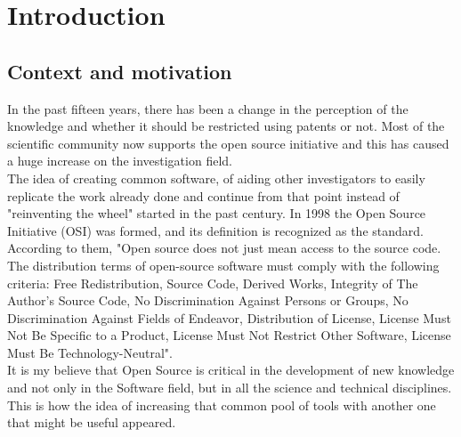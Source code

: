 \part{Introduction}

%	 
%	





\chapter{Context and motivation}
In the past fifteen years, there has been a change in the perception of the knowledge and whether it should be restricted using patents or not. Most of the scientific community now supports the open source initiative and this has caused a huge increase on the investigation field. \\



The idea of creating common software, of aiding other investigators to easily replicate the work already done and continue from that point instead of "reinventing the wheel" started in the past century. In 1998 the Open Source Initiative (OSI)\cite{osi} was formed, and its definition is recognized as the standard. According to them, "Open source does not just mean access to the source code. The distribution terms of open-source software must comply with the following criteria: Free Redistribution, Source Code, Derived Works, Integrity of The Author's Source Code, No Discrimination Against Persons or Groups, No Discrimination Against Fields of Endeavor, Distribution of License, License Must Not Be Specific to a Product, License Must Not Restrict Other Software,  License Must Be Technology-Neutral"\cite{osi_def}. 
\\

It is my believe that Open Source is critical in the development of new knowledge and not only in the Software field, but in all the science and technical disciplines. This is how the idea of increasing that common pool of tools with another one that might be useful appeared. 
\\

